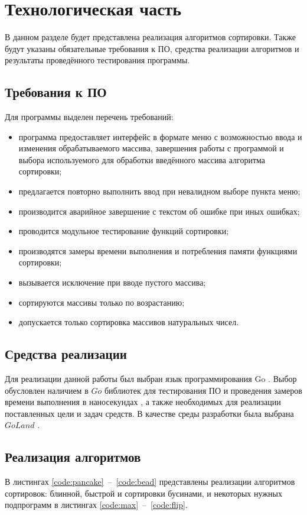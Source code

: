 \chapter{Технологическая часть}

В данном разделе будет представлена реализация алгоритмов сортировки. Также будут указаны обязательные требования к ПО, средства реализации алгоритмов и результаты проведённого тестирования программы.

\section{Требования к ПО}
Для программы выделен перечень требований:
\begin{itemize}
	\item программа предоставляет интерфейс в формате меню с возможностью ввода и изменения обрабатываемого массива, завершения работы с программой и выбора используемого для обработки введённого массива алгоритма сортировки;
	\item предлагается повторно выполнить ввод при невалидном выборе пункта меню;
	\item производится аварийное завершение с текстом об ошибке при иных ошибках;
	\item проводится модульное тестирование функций сортировки;
	\item производятся замеры времени выполнения и потребления памяти функциями сортировки;
	\item вызывается исключение при вводе пустого массива;
	\item сортируются массивы только по возрастанию;
	\item допускается только сортировка массивов натуральных чисел.
\end{itemize}

\section{Средства реализации}
Для реализации данной работы был выбран язык программирования Go \cite{web_item2}. Выбор обусловлен наличием в $Go$ библиотек для тестирования ПО и проведения замеров времени выполнения в наносекундах \cite{web_item11}, а также необходимых для реализации поставленных цели и задач средств. В качестве среды разработки была выбрана $GoLand$ \cite{web_item4}.

\section{Реализация алгоритмов}
В листингах \ref{code:pancake}~--~\ref{code:bead} представлены реализации алгоритмов сортировок: блинной, быстрой и сортировки бусинами, и некоторых нужных подпрограмм в листингах \ref{code:max}~--~\ref{code:flip}. 

